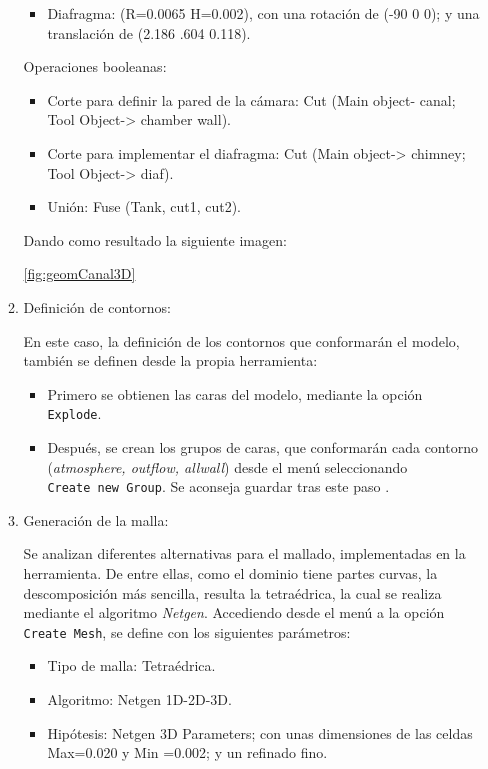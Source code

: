 \begin{itemize}
\begin{enumerate}
    \begin{itemize}
    \item
      Diafragma: (R=0.0065 H=0.002), con una rotación de (-90 0 0); y
      una translación de (2.186 .604 0.118).
    \end{itemize}

    Operaciones booleanas:

    \begin{itemize}
    \item
      Corte para definir la pared de la cámara: Cut (Main object- canal;
      Tool Object-\textgreater{} chamber wall).
    \item
      Corte para implementar el diafragma: Cut (Main
      object-\textgreater{} chimney; Tool Object-\textgreater{} diaf).
    \item
      Unión: Fuse (Tank, cut1, cut2).
    \end{itemize}

    Dando como resultado la siguiente imagen:

    \autoref{fig:geomCanal3D}

  \item
    Definición de contornos:

    En este caso, la definición de los contornos que conformarán el
    modelo, también se definen desde la propia herramienta:

    \begin{itemize}
    \item
      Primero se obtienen las caras del modelo, mediante la opción
      \texttt{Explode}.
    \item
      Después, se crean los grupos de caras, que conformarán cada
      contorno (\emph{atmosphere, outflow, allwall}) desde el menú
      seleccionando \texttt{Create\ new\ Group}. Se aconseja guardar
      tras este paso .
    \end{itemize}
  \item
    Generación de la malla:

    Se analizan diferentes alternativas para el mallado, implementadas
    en la herramienta. De entre ellas, como el dominio tiene partes
    curvas, la descomposición más sencilla, resulta la tetraédrica, la
    cual se realiza mediante el algoritmo \emph{Netgen}. Accediendo
    desde el menú a la opción \texttt{Create\ Mesh}, se define con los
    siguientes parámetros:

    \begin{itemize}
    \item
      Tipo de malla: Tetraédrica.
    \item
      Algoritmo: Netgen 1D-2D-3D.
    \item
      Hipótesis: Netgen 3D Parameters; con unas dimensiones de las
      celdas Max=0.020 y Min =0.002; y un refinado fino.
    \end{itemize}


\end{enumerate}
\end{itemize}

